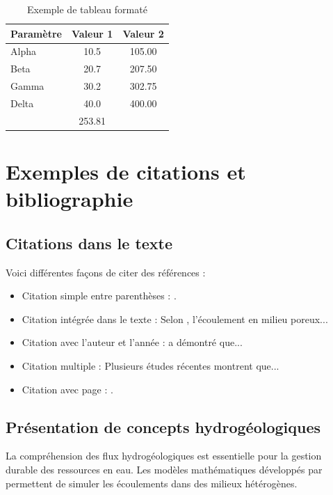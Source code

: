\documentclass[12pt,a4paper]{report}
\begin{document}
\begin{table}[H]
  \centering
  \caption{Exemple de tableau formaté}
  \label{tab:exemple}
  \begin{tabular}{l S[table-format=2.1] S[table-format=3.2]}
    \toprule
    {Paramètre} & {Valeur 1} & {Valeur 2} \\
    \midrule
    Alpha & 10.5 & 105.00 \\
    Beta & 20.7 & 207.50 \\
    Gamma & 30.2 & 302.75 \\
    Delta & 40.0 & 400.00 \\
    \addlinespace
     & 253.81 \\
    \bottomrule
  \end{tabular}
\end{table}

\section{Exemples de citations et bibliographie}
\label{sec:exemples-de-citations}

\subsection{Citations dans le texte}

Voici différentes façons de citer des références :

\begin{itemize}
    \item Citation simple entre parenthèses : \parencite{Aquilina2012}.
    \item Citation intégrée dans le texte : Selon \textcite{deDreuzy2010}, l'écoulement en milieu poreux...
    \item Citation avec l'auteur et l'année : \textcite{Bear2018} a démontré que...
    \item Citation multiple : Plusieurs études récentes \parencite{DeRidder2022,Bour2017,Roques2013} montrent que...
    \item Citation avec page : \parencite[p.~167]{Marsily1986}.
\end{itemize}

\subsection{Présentation de concepts hydrogéologiques}

La compréhension des flux hydrogéologiques est essentielle pour la gestion durable des ressources en eau. Les modèles mathématiques développés par \textcite{deDreuzy2010} permettent de simuler les écoulements dans des milieux hétérogènes. 
\end{document}
